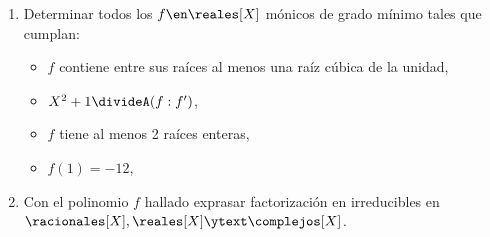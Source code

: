 \begin{enunciado}{\ejExtra}
	\begin{enumerate}[label=\alph*)]
		\item
		      Determinar todos los $f \en \reales[X]$ mónicos de grado mínimo tales que cumplan:
		      \begin{itemize}
			      \item $f$ contiene entre sus raíces al menos una raíz cúbica de la unidad,
			      \item $X^2 + 1 \divideA (f:f')$,
			      \item $f$ tiene al menos 2 raíces enteras,
			      \item $f(1) = -12$,
		      \end{itemize}

      \item Con el polinomio $f$ hallado exprasar factorización en irreducibles en $\racionales[X], \reales[X] \ytext \complejos[X]$.
	\end{enumerate}
\end{enunciado}

\hacer
